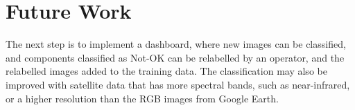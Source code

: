 \section{Future Work}
\label{sec:conc_future}

The next step is to implement a dashboard, where new images can be classified, and components classified as Not-OK can be relabelled by an operator, and the relabelled images added to the training data. The classification may also be improved with satellite data that has more spectral bands, such as near-infrared, or a higher resolution than the RGB images from Google Earth.
